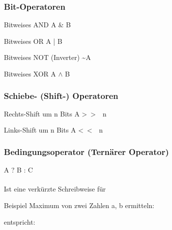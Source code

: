 				\hspace*{0.5cm}
				\begin{minipage}[t]{9 cm}
					\subsubsection{Bit-Operatoren}
						\begin{compactitem}
							\item Bitweises AND A \& B
							\item Bitweises OR A | B
							\item Bitweises NOT (Inverter) \textasciitilde A
							\item Bitweises XOR A $\wedge$ B 
						\end{compactitem}	
				\end{minipage}
				
				\subsubsection{Schiebe- (Shift-) Operatoren}
					\begin{compactitem}
						\item Rechts-Shift um n Bits A \textgreater \ \textgreater \ \ n
						\item Links-Shift um n Bits A \textless \  \textless \ \ n
					\end{compactitem}
										
				\begin{minipage}[t]{9 cm}
					\subsubsection{Bedingungsoperator (Ternärer Operator)}
						A ? B : C\\\\
						Ist eine verkürzte Schreibweise für
						
				\end{minipage}
				\hspace*{0.5cm}
				\begin{minipage}[t]{9 cm}
					
						\vspace*{0.5cm}
						Beispiel Maximum von zwei Zahlen a, b ermitteln:
						
						entspricht:
							
				\end{minipage}
